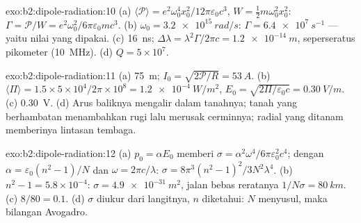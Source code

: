 \begin{solution}{exo:b2:dipole-radiation:10}
(a) $\langle\mathcal P\rangle = e^2\omega_0^4x_0^2/12\pi\varepsilon_0c^3$, $W = \tfrac12m\omega_0^2x_0^2$:
$\Gamma = \mathcal P/W = e^2\omega_0^2/6\pi\varepsilon_0mc^3$. (b) $\omega_0 = \qty{3.2e15}{rad/s}$: $\Gamma =
\qty{6.4e7}{s^{-1}}$ --- yaitu nilai yang dipakai. (c) \qty{16}{ns}; $\Delta\lambda = \lambda^2\Gamma/2\pi c =
\qty{1.2e-14}{m}$, seperseratus pikometer (\qty{10}{MHz}). (d) $Q = 5 \times 10^7$.
\end{solution}

\begin{solution}{exo:b2:dipole-radiation:11}
(a) \qty{75}{m}; $I_0 = \sqrt{2\mathcal P/R} = \qty{53}{A}$. (b) $\langle\Pi\rangle = 1.5 \times
5 \times 10^4/2\pi \times 10^8 = \qty{1.2e-4}{W/m^2}$, $E_0 = \sqrt{2\Pi/\varepsilon_0c} = \qty{0.30}{V/m}$.
(c) \qty{0.30}{V}. (d) Arus baliknya mengalir dalam tanahnya; tanah yang
berhambatan menambahkan rugi lalu merusak cerminnya; radial yang ditanam memberinya
lintasan tembaga.
\end{solution}

\begin{solution}{exo:b2:dipole-radiation:12}
(a) $p_0 = \alpha E_0$ memberi $\sigma = \alpha^2\omega^4/6\pi\varepsilon_0^2c^4$; dengan $\alpha = \varepsilon_0(n^2
- 1)/N$ dan $\omega = 2\pi c/\lambda$: $\sigma = 8\pi^3(n^2 - 1)^2/3N^2\lambda^4$. (b) $n^2 - 1 =
5.8 \times 10^{-4}$: $\sigma = \qty{4.9e-31}{m^2}$, jalan bebas reratanya $1/N\sigma = \qty{80}{km}$. (c)
$8/80 = 0.1$. (d) $\sigma$ diukur dari  langitnya, $n$
diketahui: $N$ menyusul, maka bilangan Avogadro.
\end{solution}

